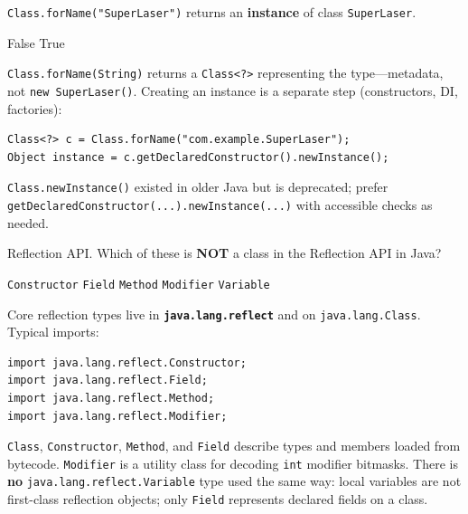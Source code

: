 \question[4]
\lstinline!Class.forName("SuperLaser")! returns an \textbf{instance} of class \texttt{SuperLaser}.
\begin{choices}
  \CorrectChoice False
  \choice True
\end{choices}
\begin{solution}
  \texttt{Class.forName(String)} returns a \texttt{Class<?>} representing the type---metadata, not \texttt{new SuperLaser()}. Creating an instance is a separate step (constructors, DI, factories):

\begin{lstlisting}[style=java]
Class<?> c = Class.forName("com.example.SuperLaser");
Object instance = c.getDeclaredConstructor().newInstance();
\end{lstlisting}

  \texttt{Class.newInstance()} existed in older Java but is deprecated; prefer \texttt{getDeclaredConstructor(...).newInstance(...)} with accessible checks as needed.
\end{solution}


\newpage


\question[4]
Reflection API. Which of these is \textbf{NOT} a class in the Reflection API in Java?
\begin{choices}
  \choice \texttt{Constructor}
  \choice \texttt{Field}
  \choice \texttt{Method}
  \choice \texttt{Modifier}
  \CorrectChoice \texttt{Variable}
\end{choices}
\begin{solution}
  Core reflection types live in \textbf{\texttt{java.lang.reflect}} and on \texttt{java.lang.Class}. Typical imports:

\begin{lstlisting}[style=java]
import java.lang.reflect.Constructor;
import java.lang.reflect.Field;
import java.lang.reflect.Method;
import java.lang.reflect.Modifier;
\end{lstlisting}

  \texttt{Class}, \texttt{Constructor}, \texttt{Method}, and \texttt{Field} describe types and members loaded from bytecode. \texttt{Modifier} is a utility class for decoding \texttt{int} modifier bitmasks. There is \textbf{no} \texttt{java.lang.reflect.Variable} type used the same way: local variables are not first-class reflection objects; only \texttt{Field} represents declared fields on a class.
\end{solution}

